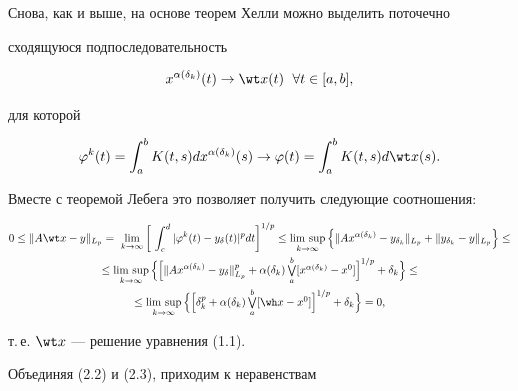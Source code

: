 \begin{pf}
Снова, как и выше, на основе теорем Хелли можно выделить поточечно


сходящуюся подпоследовательность


\begin{equation}


x^{\alpha(\delta_k)}(t) \to \wt x(t) \ \;


\forall t\in[a,b],


\end{equation}


для которой


$$


\varphi^k(t) =\int_a^b K(t,s)dx^{\alpha(\delta_k)}(s)


\to \varphi(t) = \int_a^b K(t,s)d\wt x(s).


$$


Вместе с теоремой Лебега это позволяет получить следующие соотношения:


\begin{multline*}


0 \le \|A\wt x - y\|_{L_p} =\


\lim_{k\to\infty}\bigg[\,\int_c^d


|\varphi^k(t)- y_\delta(t)|^p dt\bigg]^{1/p} \le


\Limsup_{k\to\infty}\left\{\|Ax^{\alpha(\delta_k)}-y_{\delta_k}\|_{L_p}


+ \|y_{\delta_k} - y\|_{L_p}\right\} \le \\


%


\le \Limsup_{k\to\infty}\Big\{\Big[\|Ax^{\alpha(\delta_k)}-y_\delta\|^p_{L_p}


+\alpha(\delta_k)\textstyle\bigvee\limits_a^b


[x^{\alpha(\delta_k)} - x^0]\Big]^{1/p} + \delta_k\Big\}\le \\


%


\le \Limsup_{k\to\infty}\Big\{\Big[\delta^p_k + \alpha(\delta_k)


\textstyle\bigvee\limits_a^b[ \wh x - x^0]\Big]^{1/p}+\delta_k\Big\} = 0,


\end{multline*}


т.\,е. $\wt x$ --- решение уравнения (1.1).





Объединяя (2.2) и (2.3), приходим к неравенствам


\begin{equation}



\end{equation}
\end{pf}

